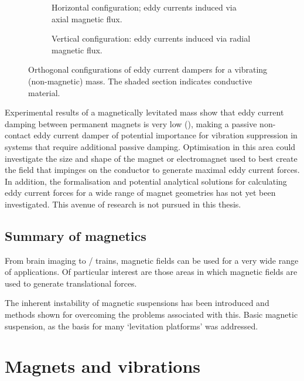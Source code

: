 \documentclass[11pt,a4paper]{memoir}
\begin{document}
\begin{figure}
  \begin{subfigure}
    \caption{Horizontal configuration; eddy
      currents induced via axial magnetic
      flux.}
  \end{subfigure}
  \hfil
  \begin{subfigure}
    \caption{Vertical configuration: eddy
       currents induced via radial magnetic
       flux.}
  \end{subfigure}
  \caption{Orthogonal configurations of eddy current dampers for a vibrating
    (non-magnetic) mass. The shaded section indicates conductive material.}
\end{figure}

Experimental results of a magnetically levitated mass show that eddy current damping between permanent magnets is very low (), making a passive non-contact eddy current damper of potential importance for vibration suppression in systems that require additional passive damping.
Optimisation in this area could investigate the size and shape of the magnet or electromagnet used to best create the field that impinges on the conductor to generate maximal eddy current forces.
In addition, the formalisation and potential analytical solutions for calculating eddy current forces for a wide range of magnet geometries has not yet been investigated.
This avenue of research is not pursued in this thesis.


\subsection{Summary of magnetics}

From brain imaging to \maglev/ trains, magnetic fields can be used for a very wide range of applications. Of particular interest are those areas in which magnetic fields are used to generate translational forces.

The inherent instability of magnetic suspensions has been introduced and methods shown for overcoming the problems associated with this.
Basic magnetic suspension, as the basis for many `levitation platforms' was addressed.


\section{Magnets and vibrations}
\end{document}
